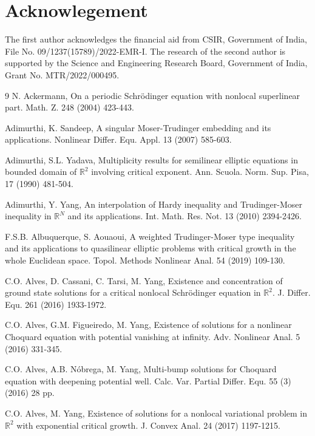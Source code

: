 \documentclass[11pt]{amsart}
\numberwithin{equation}{section}
\newcommand{\R}{\mathbb{R}}
\newcommand{\1}{\frac{1}{2}}
\begin{document}
	
	
	
	
	\section*{Acknowlegement} 
	The first author acknowledges the financial aid from CSIR, Government of India, File No. 09/1237(15789)/2022-EMR-I. The research of the second author is supported by the Science and Engineering Research Board, Government of India, Grant No. MTR/2022/000495.
	\begin{thebibliography}{9}
		 N. Ackermann, On a periodic Schr\"odinger equation with nonlocal superlinear part. Math. Z. 248 (2004) 423-443.
		
		 Adimurthi, K. Sandeep, A singular Moser-Trudinger embedding and its applications.
		Nonlinear Differ. Equ. Appl. 13 (2007) 585-603.
		
		 Adimurthi, S.L. Yadava, Multiplicity results for semilinear elliptic equations in bounded domain of $\R^2$ involving critical exponent. Ann. Scuola. Norm. Sup. Pisa, 17 (1990) 481-504.
		
		 Adimurthi, Y. Yang, An interpolation of Hardy inequality and Trudinger-Moser inequality in $\R^N$ and its applications. Int. Math. Res. Not. 13 (2010) 2394-2426.
		
		 F.S.B. Albuquerque, S. Aouaoui, A weighted Trudinger-Moser type inequality and its applications to quasilinear elliptic problems with critical growth in the whole Euclidean space. Topol. Methods Nonlinear Anal. 54 (2019) 109-130.
		
		 C.O. Alves, D. Cassani, C. Tarsi, M. Yang, Existence and concentration of ground state solutions for a critical nonlocal Schr\"{o}dinger equation in $\R^2$. J. Differ. Equ. 261 (2016) 1933-1972. 
		
		 C.O. Alves, G.M. Figueiredo, M. Yang, Existence of solutions for a nonlinear Choquard equation with potential vanishing at infinity. Adv. Nonlinear Anal. 5 (2016) 331-345.
		
		 C.O. Alves, A.B. N\'obrega, M. Yang, Multi-bump solutions for Choquard equation with deepening potential well. Calc. Var. Partial Differ. Equ. 55 (3) (2016) 28 pp.
		
		 C.O. Alves, M. Yang, Existence of solutions for a nonlocal variational problem in $\R^2$ with exponential critical growth. J. Convex Anal. 24 (2017) 1197-1215.
		

\end{thebibliography}
\end{document}
